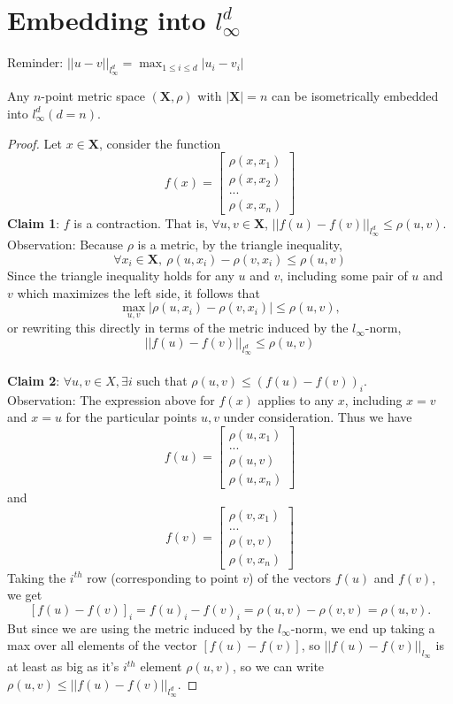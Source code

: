 \section{Embedding into $l_\infty^d$} 
Reminder: $||u-v||_{l_\infty^d}=\max_{1\leq i \leq d} |u_i-v_i|$\\


\begin{theorem}[Fr\'echet]
Any $n$-point metric space $(\mathbf{X}, \rho)$ with $|\mathbf{X}|=n$
can be isometrically embedded into $l_\infty^d (d=n)$.  
\end{theorem}
\begin{proof}
Let $x \in \mathbf{X}$, consider the function 
\[
f(x)=
\begin{bmatrix}
    \rho (x,x_1)\\
    \rho (x,x_2)\\
    ...\\
    \rho (x,x_n)
\end{bmatrix}
\]
\textbf{Claim 1}: $f$ is a contraction. That is, $\forall u,v \in
\mathbf{X}$, $||f(u)-f(v)||_{l_\infty^d} \leq \rho (u,v)$.\\ 
Observation: Because $\rho$ is a metric, by the triangle
inequality, 
\[
\forall x_i \in \mathbf{X},\ \rho (u,x_i) - \rho (v,x_i) \leq \rho
(u,v) 
\]
Since the triangle inequality holds for any $u$ and $v$,
including some pair of $u$ and $v$ which maximizes the left
side, it follows that 
\[
\max_{u,v} | \rho (u,x_i) - \rho (v,x_i)| \leq \rho (u,v),\]
or rewriting this directly in terms of the metric induced by
the $l_\infty$-norm,
\[
||f(u)-f(v)||_{l_\infty^d} \leq \rho (u,v)
\]
\\
\textbf{Claim 2}: $\forall u,v \in X, \exists i$ such that $\rho (u,v) 
\leq (f(u)-f(v))_{i}$.\\
Observation: The expression above for $f(x)$ applies to any $x$,
including $x=v$ and $x=u$ for the particular points
$u,v$ under 
consideration.
Thus we have
\[
f(u)=
\begin{bmatrix}
\rho (u,x_1)\\
...\\
\rho (u,v)\\
\rho (u,x_n)
\end{bmatrix}
\]
and
\[
f(v)=
\begin{bmatrix}
\rho (v,x_1)\\
...\\
\rho (v,v)\\
\rho (v,x_n)
\end{bmatrix}
\]
Taking the $i^{th}$ row (corresponding to point $v$) 
of the vectors $f(u)$ and $f(v)$,
we get
\[
[f(u)-f(v)]_{i} = f(u)_{i}-f(v)_{i} = \rho (u,v) - \rho (v,v)
= \rho (u,v).
\]
But since we are using the metric induced by the 
$l_\infty$-norm, we end up taking a max over all elements of
the vector $[f(u)-f(v)]$, so $||f(u)-f(v)||_{l_\infty}$
is at least as big as it's $i^{th}$ element
$\rho (u,v)$, so we can write
$\rho (u,v) \leq ||f(u)-f(v)||_{l_\infty^d}$.


\end{proof}
